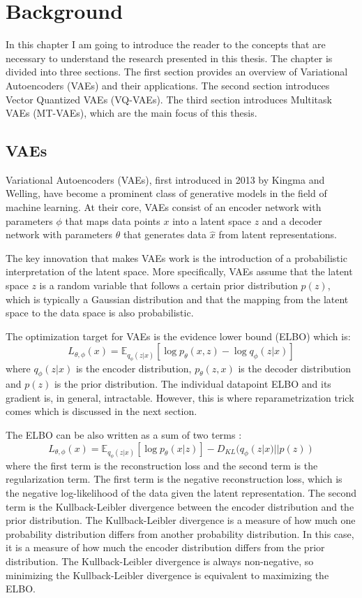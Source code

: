 \chapter{Background}

In this chapter I am going to introduce the reader to the concepts that are necessary to understand the research presented in this thesis. The chapter is divided into three sections. The first section provides an overview of Variational Autoencoders (VAEs) and their applications. The second section introduces Vector Quantized VAEs (VQ-VAEs). The third section introduces Multitask VAEs (MT-VAEs), which are the main focus of this thesis.

\section{VAEs}

Variational Autoencoders (VAEs), first introduced in 2013 by Kingma and Welling\cite{kingma2022autoencoding}, have become a prominent class of generative models in the field of machine learning.  At their core, VAEs consist of an encoder network with parameters $\phi$ that maps data points $x$ into a latent space $z$ and a decoder network with parameters $\theta$ that generates data $\hat{x}$ from latent representations\cite{Kingma_2019}. 

The key innovation that makes VAEs work is the introduction of a probabilistic interpretation of the latent space. More specifically, VAEs assume that the latent space $z$ is a random variable that follows a certain prior distribution $p(z)$, which is typically a Gaussian distribution and that the mapping from the latent space to the data space is also probabilistic\cite{kingma2022autoencoding}.

The optimization target for VAEs is the evidence lower bound (ELBO) which is: \[ L_{\theta, \phi}(x) = \mathbb{E}_{q_{\phi}(z|x)} [\log p_{\theta}(x, z) - \log q_{\phi}(z|x)] \] where $q_{\phi}(z|x)$ is the encoder distribution, $p_{\theta}(z, x)$ is the decoder distribution and $p(z)$ is the prior distribution. The individual datapoint ELBO and its gradient is, in general, intractable. However, this is where reparametrization trick comes which is discussed in the next section.

The ELBO can be also written as a sum of two terms\cite{kingma2022autoencoding}
: \[ L_{\theta, \phi}(x) = \mathbb{E}_{q_{\phi}(z|x)} [\log p_{\theta}(x|z)] - D_{KL}(q_{\phi}(z|x) || p(z)) \] where the first term is the reconstruction loss and the second term is the regularization term. The first term is the negative reconstruction loss, which is the negative log-likelihood of the data given the latent representation. The second term is the Kullback-Leibler divergence between the encoder distribution and the prior distribution. The Kullback-Leibler divergence is a measure of how much one probability distribution differs from another probability distribution. In this case, it is a measure of how much the encoder distribution differs from the prior distribution. The Kullback-Leibler divergence is always non-negative, so minimizing the Kullback-Leibler divergence is equivalent to maximizing the ELBO.
